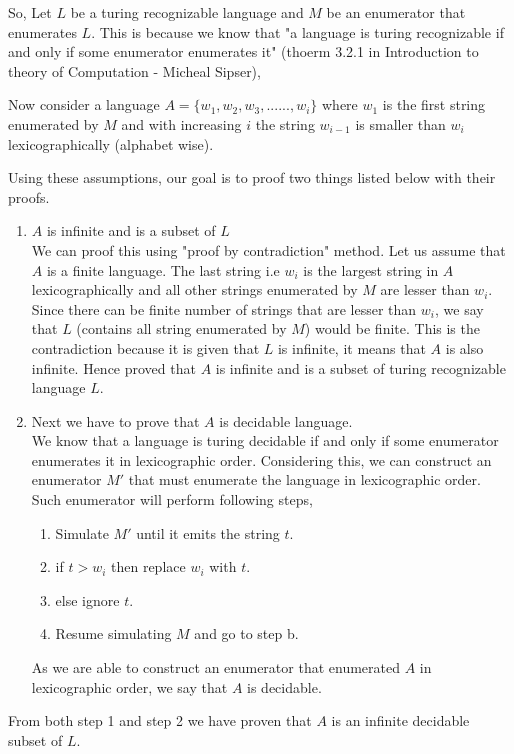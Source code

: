 \documentclass[a4page]{exam}
\begin{document}
\begin{questions}
\begin{solution}
    So, Let $L$ be a turing recognizable language and $M$ be an enumerator that enumerates $L$. This is because we know that "a language is turing recognizable if and only if some enumerator enumerates it" (thoerm 3.2.1 in Introduction to theory of Computation - Micheal Sipser),
    
    Now consider a language $A = \{w_1,w_2,w_3,......, w_i\}$ where $w_1$ is the first string enumerated by $M$ and with increasing $i$ the string $w_{i-1}$ is smaller than $w_i$ lexicographically (alphabet wise).
    
    Using these assumptions, our goal is to proof two things listed below with their proofs.
    \begin{enumerate}
    \item $A$ is infinite and is a subset of $L$\\
      We can proof this using "proof by contradiction" method. Let us assume that $A$ is a finite language. The last string i.e $w_i$ is the largest string in $A$ lexicographically and all other strings enumerated by $M$ are lesser than ${w_i}$. Since there can be finite number of strings that are lesser than $w_i$, we say that $L$ (contains all string enumerated by $M$) would be finite. This is the contradiction because it is given that $L$ is infinite, it means that $A$ is also infinite. Hence proved that $A$ is infinite and is a subset of turing recognizable language $L$.    
      
    \item Next we have to prove that $A$ is decidable language. \\
      We know that a language is turing decidable if and only if some enumerator enumerates it in lexicographic order. Considering this, we can construct an enumerator $M'$ that must enumerate the language in lexicographic order. Such enumerator will perform following steps, 
      \begin{enumerate}
      \item Simulate $M'$ until it emits the string $t$. 
      \item if $t > w_i$ then replace $w_i$ with $t$.
      \item else ignore $t$.
      \item Resume simulating $M$ and go to step b. 
      \end{enumerate}
      As we are able to construct an enumerator that enumerated $A$ in lexicographic order, we say that $A$ is decidable.
    \end{enumerate}
    From both step 1 and step 2 we have proven that $A$ is an infinite decidable subset of $L$.
  \end{solution}
  

\end{questions}
\end{document}

